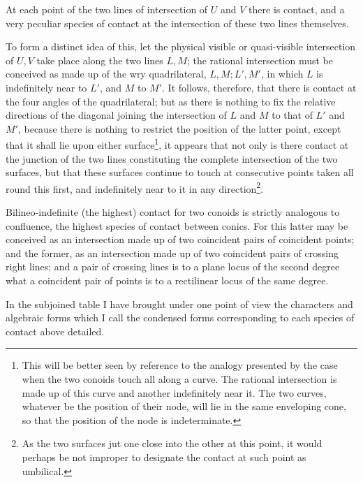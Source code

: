 \documentclass[11pt]{article}
\newcommand{\sourcepage}[1]{\marginpar{\scriptsize p.~#1}}
\begin{document}
{{At each point of the two lines of intersection of $U$ and $V$ there is contact, and a very peculiar species of contact at the intersection of these two lines themselves.

\sourcepage{236}
To form a distinct idea of this, let the physical visible or quasi-visible intersection of $U,V$ take place along the two lines $L,M$; the rational intersection must be conceived as made up of the wry quadrilateral, $L,M; L',M'$, in which $L$ is indefinitely near to $L'$, and $M$ to $M'$. It follows, therefore, that there is contact at the four angles of the quadrilateral; but as there is nothing to fix the relative directions of the diagonal joining the intersection of $L$ and $M$ to that of $L'$ and $M'$, because there is nothing to restrict the position of the latter point, except that it shall lie upon either surface\footnote{This will be better seen by reference to the analogy presented by the case when the two conoids touch all along a curve. The rational intersection is made up of this curve and another indefinitely near it. The two curves, whatever be the position of their node, will lie in the same enveloping cone, so that the position of the node is indeterminate.}, it appears that not only is there contact at the junction of the two lines constituting the complete intersection of the two surfaces, but that these surfaces continue to touch at consecutive points taken all round this first, and indefinitely near to it in any direction\footnote{As the two surfaces jut one close into the other at this point, it would perhaps be not improper to designate the contact at such point as umbilical.}.

Bilineo-indefinite (the highest) contact for two conoids is strictly analogous to confluence, the highest species of contact between conics. For this latter may be conceived as an intersection made up of two coincident pairs of coincident points; and the former, as an intersection made up of two coincident pairs of crossing right lines; and a pair of crossing lines is to a plane locus of the second degree what a coincident pair of points is to a rectilinear locus of the same degree.

In the subjoined table I have brought under one point of view the characters and algebraic forms which I call the condensed forms corresponding to each species of contact above detailed.

}}
\end{document}
